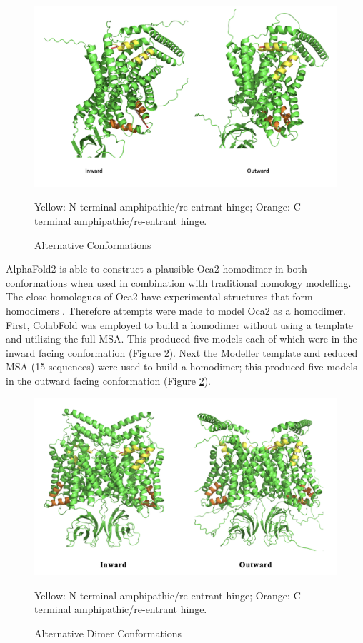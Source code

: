 \begin{figure}[th!]
    \centering
    \includegraphics[width=150mm, scale=0.75]{oca2/oca2_9.png}
    \caption{Alternative Conformations}
    \label{fig:oca2_9}
    \small
    Yellow: N-terminal amphipathic/re-entrant hinge; Orange: C-terminal amphipathic/re-entrant hinge.
\end{figure}
 


AlphaFold2 is able to construct a plausible Oca2 homodimer in both conformations when used in combination with traditional homology modelling. The close homologues of Oca2 have experimental structures that form homodimers \cite{nie2017structure,sauer2021structure}. Therefore attempts were made to model Oca2 as a homodimer.   First, ColabFold was employed to build a homodimer without using a template and utilizing the full MSA.  This produced five models each of which were in the inward facing conformation (Figure \ref{fig:oca2_10}).  Next the Modeller template and reduced MSA (15 sequences) were used to build a homodimer; this produced five models in the outward facing conformation (Figure \ref{fig:oca2_10}).

\begin{figure}[th!]
    \centering
    \includegraphics[width=150mm, scale=0.75]{oca2/oca2_10.png}
    \caption{Alternative Dimer Conformations}
    \label{fig:oca2_10}
    \small
    Yellow: N-terminal amphipathic/re-entrant hinge; Orange: C-terminal amphipathic/re-entrant hinge.
\end{figure}
 
